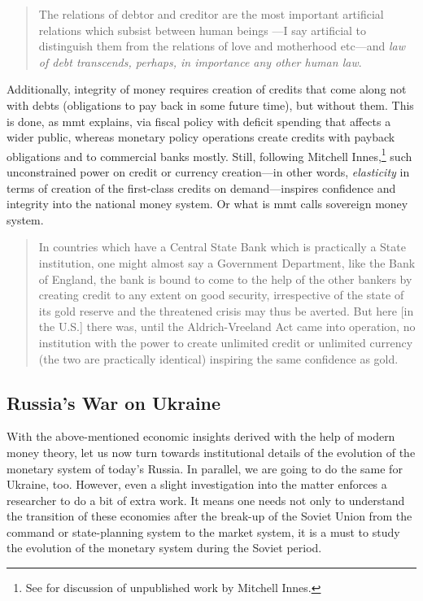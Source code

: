 \begin{quote}
The relations of debtor and creditor are the most important artificial
 relations which subsist between human beings ---I say artificial to
 distinguish them from the relations of love and motherhood etc---and
 \textit{law of debt transcends, perhaps, in importance any other human law}.
 \citep[emphasis added]{innes1910}
\end{quote}

Additionally, integrity of money requires creation of credits that come
along not with debts (obligations to pay back in some future time), but
without them. This is done, as \ac{mmt} explains, via fiscal policy with
deficit spending that affects a wider public, whereas monetary policy
operations create credits with payback obligations and to commercial
banks mostly. Still, following Mitchell Innes,\footnote{See \citep{valchyshen_innes} for discussion of unpublished work by Mitchell Innes.} such unconstrained
power on credit or currency creation---in other words, \textit{elasticity} in
terms of creation of the first-class credits on demand---inspires
confidence and integrity into the national money system. Or what is \ac{mmt}
calls sovereign money system.

\begin{quote}
 In countries which have a Central State Bank which is practically a
 State institution, one might almost say a Government Department, like
 the Bank of England, the bank is bound to come to the help of the
 other bankers by creating credit to any extent on good security,
 irrespective of the state of its gold reserve and the threatened
 crisis may thus be averted. But here [in the U.S.] there was, until
 the Aldrich-Vreeland Act came into operation, no institution with the
 power to create unlimited credit or unlimited currency (the two are
 practically identical) inspiring the same confidence as gold.~\citep{innes1910}
\end{quote}

\subsection{Russia's War on Ukraine}

With the above-mentioned economic insights derived with the help of
modern money theory, let us now turn towards institutional details of
the evolution of the monetary system of today's Russia. In parallel, we
are going to do the same for Ukraine, too. However, even a slight
investigation into the matter enforces a researcher to do a bit of extra
work. It means one needs not only to understand the transition of these
economies after the break-up of the Soviet Union from the command or
state-planning system to the market system, it is a must to study the
evolution of the monetary system during the Soviet period.

